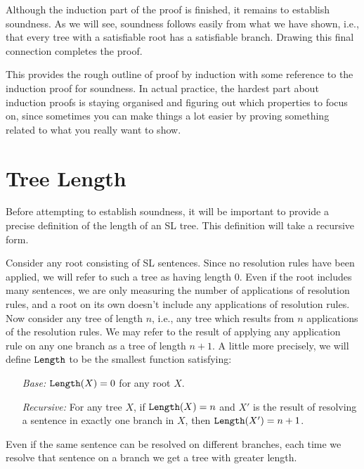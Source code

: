 Although the induction part of the proof is finished, it remains to establish soundness.
As we will see, soundness follows easily from what we have shown, i.e., that every tree with a satisfiable root has a satisfiable branch.
Drawing this final connection completes the proof.

This provides the rough outline of proof by induction with some reference to the induction proof for soundness.
In actual practice, the hardest part about induction proofs is staying organised and figuring out which properties to focus on, since sometimes you can make things a lot easier by proving something related to what you really want to show.





\section{Tree Length}

Before attempting to establish soundness, it will be important to provide a precise definition of the length of an SL tree.
This definition will take a recursive form.

Consider any root consisting of SL sentences.
Since no resolution rules have been applied, we will refer to such a tree as having length 0.
Even if the root includes many sentences, we are only measuring the number of applications of resolution rules, and a root on its own doesn't include any applications of resolution rules.
Now consider any tree of length $n$, i.e., any tree which results from $n$ applications of the resolution rules. 
We may refer to the result of applying any application rule on any one branch as a tree of length $n+1$.
A little more precisely, we will define $\texttt{Length}$ to be the smallest function satisfying:%
\begin{enumerate}[leftmargin=1in,labelsep=.15in]
  \item[\it Base:] $\texttt{Length}(X)=0$ for any root $X$.
  \item[\it Recursive:] For any tree $X$, if $\texttt{Length}(X)=n$ and $X'$ is the result of resolving a sentence in exactly one branch in $X$, then $\texttt{Length}(X')=n+1$.
\end{enumerate}
Even if the same sentence can be resolved on different branches, each time we resolve that sentence on a branch we get a tree with greater length.




